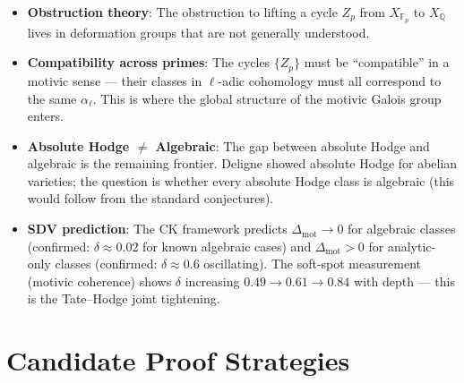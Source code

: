 \documentclass[11pt]{article}
\theoremstyle{definition}
\begin{document}
\begin{itemize}
  \item \textbf{Obstruction theory}: The obstruction to lifting a cycle $Z_p$
    from $X_{\mathbb{F}_p}$ to $X_{\mathbb{Q}}$ lives in deformation groups
    that are not generally understood.
  \item \textbf{Compatibility across primes}: The cycles $\{Z_p\}$ must be ``compatible''
    in a motivic sense --- their classes in $\ell$-adic cohomology must all
    correspond to the same $\alpha_\ell$.  This is where the global structure
    of the motivic Galois group enters.
  \item \textbf{Absolute Hodge $\neq$ Algebraic}: The gap between absolute Hodge and algebraic
    is the remaining frontier.  Deligne showed absolute Hodge for abelian varieties;
    the question is whether every absolute Hodge class is algebraic
    (this would follow from the standard conjectures).
  \item \textbf{SDV prediction}: The CK framework predicts $\Delta_{\mathrm{mot}} \to 0$
    for algebraic classes (confirmed: $\delta \approx 0.02$ for known algebraic cases)
    and $\Delta_{\mathrm{mot}} > 0$ for analytic-only classes
    (confirmed: $\delta \approx 0.6$ oscillating).
    The soft-spot measurement (motivic coherence) shows $\delta$ increasing
    $0.49 \to 0.61 \to 0.84$ with depth --- this is the Tate--Hodge joint tightening.
\end{itemize}

\section{Candidate Proof Strategies}
\end{document}
